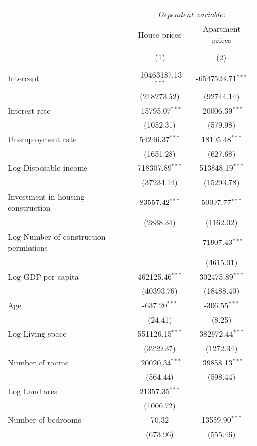 \begin{table}[!htbp] \centering
\begin{tabular}{@{\extracolsep{5pt}}lcc}
\\[-1.8ex]\hline
\hline \\[-1.8ex]
& \multicolumn{2}{c}{\textit{Dependent variable:}} \
\cr \cline{2-3}
\\[-1.8ex] & \multicolumn{1}{c}{House prices} & \multicolumn{1}{c}{Apartment prices}  \\
\\[-1.8ex] & (1) & (2) \\
\hline \\[-1.8ex]
 Intercept & -10463187.13$^{***}$ & -6547523.71$^{***}$ \\
  & (218273.52) & (92744.14) \\
 Interest rate & -15795.07$^{***}$ & -20006.39$^{***}$ \\
  & (1052.31) & (579.98) \\
 Unemployment rate & 54246.37$^{***}$ & 18105.48$^{***}$ \\
  & (1651.28) & (627.68) \\
 Log Disposable income & 718307.89$^{***}$ & 513848.19$^{***}$ \\
  & (37234.14) & (15293.78) \\
 Investment in housing construction & 83557.42$^{***}$ & 50097.77$^{***}$ \\
  & (2838.34) & (1162.02) \\
 Log Number of construction permissions & & -71907.43$^{***}$ \\
  & & (4615.01) \\
 Log GDP per capita & 462125.46$^{***}$ & 302475.89$^{***}$ \\
  & (40393.76) & (18488.40) \\
 Age & -637.20$^{***}$ & -306.55$^{***}$ \\
  & (24.41) & (8.25) \\
 Log Living space & 551126.15$^{***}$ & 382972.44$^{***}$ \\
  & (3229.37) & (1272.34) \\
 Number of rooms & -20020.34$^{***}$ & -39858.13$^{***}$ \\
  & (564.44) & (598.44) \\
 Log Land area & 21357.35$^{***}$ & \\
  & (1006.72) & \\
 Number of bedrooms & 70.32$^{}$ & 13559.90$^{***}$ \\
  & (673.96) & (555.46) \\

\end{tabular}
\end{table}
